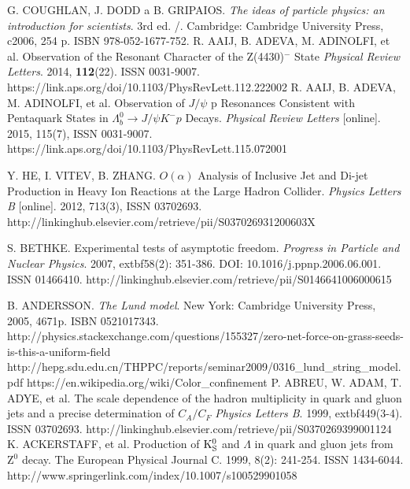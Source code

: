 \documentclass[thesismargins, thesislinespacing]{rnthesis}
\begin{document}
%


\begin{thebibliography}{}

G. COUGHLAN, J. DODD a B. GRIPAIOS. \textit{The ideas of particle physics: an introduction for scientists}. 3rd ed. /. Cambridge: Cambridge University Press, c2006, 254 p. ISBN 978-052-1677-752.
R. AAIJ, B. ADEVA, M. ADINOLFI, et al. Observation of the Resonant Character of the Z(4430)$^{-}$ State \textit{Physical Review Letters}. 2014, \textbf{112}(22). ISSN 0031-9007. https://link.aps.org/doi/10.1103/PhysRevLett.112.222002
R. AAIJ, B. ADEVA, M. ADINOLFI, et al. Observation of $J / \psi$ p Resonances Consistent with Pentaquark States in $\Lambda_b^0 \rightarrow J / \psi K^{-}p$ Decays. \textit{Physical Review Letters} [online]. 2015, 115(7),  ISSN 0031-9007. https://link.aps.org/doi/10.1103/PhysRevLett.115.072001

Y. HE, I. VITEV, B. ZHANG. 
 $O(\alpha)$ Analysis of Inclusive Jet and Di-jet Production in Heavy Ion Reactions at the Large Hadron Collider. \textit{Physics Letters B} [online]. 2012, 713(3), ISSN 03702693. http://linkinghub.elsevier.com/retrieve/pii/S037026931200603X

S. BETHKE. Experimental tests of asymptotic freedom. \textit{Progress in Particle and Nuclear Physics}. 2007, extbf{58}(2): 351-386. DOI: 10.1016/j.ppnp.2006.06.001. ISSN 01466410.  http://linkinghub.elsevier.com/retrieve/pii/S0146641006000615

B. ANDERSSON. \textit{The Lund model}. New York: Cambridge University Press, 2005, 4671p. ISBN 0521017343.
http://physics.stackexchange.com/questions/155327/zero-net-force-on-grass-seeds-is-this-a-uniform-field
http://hepg.sdu.edu.cn/THPPC/reports/seminar2009/0316\_lund\_string\_model.pdf
https://en.wikipedia.org/wiki/Color\_confinement
P. ABREU, W. ADAM, T. ADYE, et al. The scale dependence of the hadron multiplicity in quark and gluon jets and a precise determination of $C_A/C_F$ \textit{Physics Letters B}. 1999, extbf{449}(3-4). ISSN 03702693.  http://linkinghub.elsevier.com/retrieve/pii/S0370269399001124
K. ACKERSTAFF, et al.  Production of ${\rm K}^0_{\rm S}$ and $\Lambda$ in quark and gluon jets from $\mathrm{Z^0}$ decay. The European Physical Journal C. 1999, 8(2): 241-254. ISSN 1434-6044.
http://www.springerlink.com/index/10.1007/s100529901058


\end{thebibliography}
\end{document}
